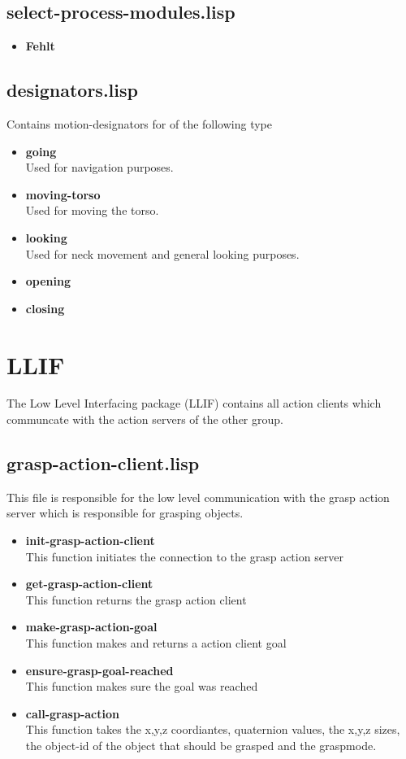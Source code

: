 \documentclass[main.tex]{subfiles}
\begin{document}
	    \subsection{select-process-modules.lisp}
	     \begin{itemize}
	    	\item \textbf{Fehlt} \\
	    \end{itemize}
	    \subsection{designators.lisp}
	    Contains motion-designators for of the following type
	    \begin{itemize}
	    	\item \textbf{going} \\
		Used for navigation purposes.
		\item \textbf{moving-torso} \\
		Used for moving the torso.
		\item \textbf{looking} \\
		Used for neck movement and general looking purposes.
		\item \textbf{opening} \\
		
		\item \textbf{closing} \\
	    \end{itemize}

	  	\section{LLIF}
		The Low Level Interfacing package (LLIF) contains all action clients which communcate with the action servers of the other group.
		\subsection{grasp-action-client.lisp}
		This file is responsible for the low level communication with the
		grasp action server which is responsible for grasping objects.
		\begin{itemize}
			\item \textbf{init-grasp-action-client} \\
			This function initiates the connection to the grasp action server
			\item \textbf{get-grasp-action-client} \\
			This function returns the grasp action client
			\item \textbf{make-grasp-action-goal} \\
			This function makes and returns a action client goal
			\item \textbf{ensure-grasp-goal-reached} \\
            This function makes sure the goal was reached
			\item \textbf{call-grasp-action} \\
			This function takes the x,y,z coordiantes, quaternion values, the x,y,z sizes, the object-id of the object that should be grasped and the graspmode.
		\end{itemize}
\end{document}
